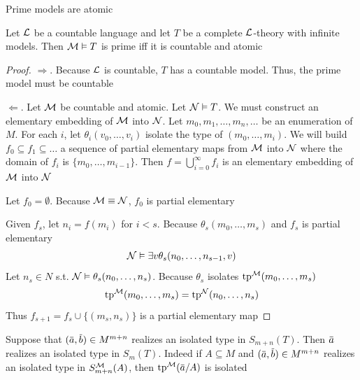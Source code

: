 \documentclass[11pt]{article}
\begin{document}
Prime models are atomic

\begin{theorem}[]
\label{thm4.2.8}
Let \(\mathcal{L}\) be a countable language and let \(T\) be a complete \(\mathcal{L}\)-theory with infinite models.
Then \(\mathcal{M}\vDash T\) is prime iff it is countable and atomic
\end{theorem}

\begin{proof}
\(\Rightarrow\). Because \(\mathcal{L}\) is countable, \(T\) has a countable model. Thus, the prime model must be
countable

\(\Leftarrow\). Let \(\mathcal{M}\) be countable and atomic. Let \(\mathcal{N}\vDash T\). We must construct an elementary
embedding of \(\mathcal{M}\) into \(\mathcal{N}\). Let \(m_0,m_1,\dots,m_n,\dots\) be an enumeration of \(M\). For
each \(i\), let \(\theta_i(v_0,\dots,v_i)\) isolate the type of \((m_0,\dots,m_i)\). We will
build \(f_0\subseteq f_1\subseteq\dots\) a sequence of partial elementary maps from \(\mathcal{M}\) into \(\mathcal{N}\) where the domain
of \(f_i\) is \(\{m_0,\dots,m_{i-1}\}\). Then \(f=\bigcup_{i=0}^\infty f_i\)  is an elementary embedding of \(\mathcal{M}\)
into \(\mathcal{N}\)

Let \(f_0=\emptyset\). Because \(\mathcal{M}\equiv\mathcal{N}\), \(f_0\) is partial elementary

Given \(f_s\), let \(n_i=f(m_i)\) for \(i<s\). Because \(\theta_s(m_0,\dots,m_s)\) and \(f_s\) is partial
elementary
\begin{equation*}
\mathcal{N}\vDash\exists v\theta_s(n_0,\dots,n_{s-1},v)
\end{equation*}
Let \(n_s\in N\) s.t. \(\mathcal{N}\vDash\theta_s(n_0,\dots,n_s)\). Because \(\theta_s\) isolates \(\operatorname{tp}^{\mathcal{M}}(m_0,\dots,m_s)\)
\begin{equation*}
\operatorname{tp}^{\mathcal{M}}(m_0,\dots,m_s)=\operatorname{tp}^{\mathcal{N}}(n_0,\dots,n_s)
\end{equation*}
Thus \(f_{s+1}=f_s\cup\{(m_s,n_s)\}\) is a partial elementary map
\end{proof}

\begin{lemma}[]
\label{lemma4.2.9}
Suppose that \((\bara,\barb)\in M^{m+n}\) realizes an isolated type in \(S_{m+n}(T)\).
Then \(\bara\) realizes an isolated type in \(S_m(T)\). Indeed if \(A\subseteq M\)
and \((\bara,\barb)\in M^{m+n}\) realizes an isolated type in \(S_{m+n}^{\mathcal{M}}(A)\),
then \(\tp^{\calm}(\bara/A)\) is isolated
\end{lemma}
\end{document}
